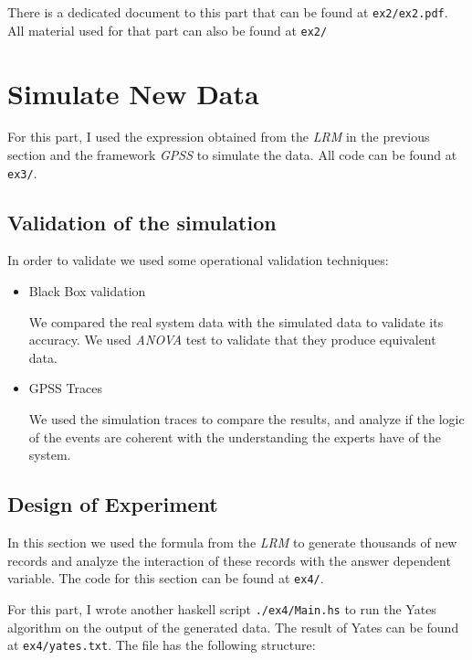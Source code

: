 \documentclass[12pt, a4paper]{article} %
\theoremstyle{definition}
\newcommand{\code}[1]{\texttt{#1}} %
\begin{document}
There is a dedicated document to this part that can be found at \code{ex2/ex2.pdf}. All material used for that part can also be found at \code{ex2/}

\section{Simulate New Data}

For this part, I used the expression obtained from the \textit{LRM} in the previous section and the framework \textit{GPSS} to simulate the data. All code can be found at \code{ex3/}.

\subsection{Validation of the simulation}

In order to validate we used some operational validation techniques:

\begin{itemize}
  \item Black Box validation

    We compared the real system data with the simulated data to validate its accuracy. We used \textit{ANOVA} test to validate that they produce equivalent data.

  \item GPSS Traces

    We used the simulation traces to compare the results, and analyze if the logic of the events are coherent with the understanding the experts have of the system.
\end{itemize}

\subsection{Design of Experiment}

In this section we used the formula from the \textit{LRM} to generate thousands of new records and analyze the interaction of these records with the answer dependent variable. The code for this section can be found at \code{ex4/}.

For this part, I wrote another haskell script \code{./ex4/Main.hs} to run the Yates algorithm on the output of the generated data. The result of Yates can be found at \code{ex4/yates.txt}. The file has the following structure:
\end{document}
